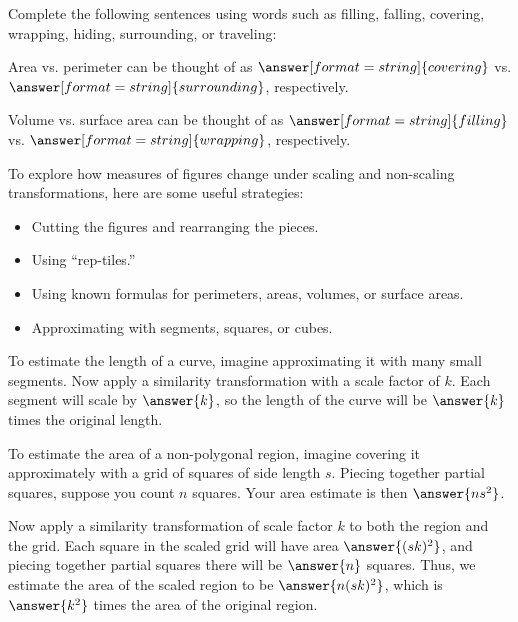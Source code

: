 \documentclass[nooutcomes]{ximera}
\begin{document}
\begin{question}
Complete the following sentences using words such as filling, falling, covering, wrapping, hiding, surrounding, or traveling:  

Area vs. perimeter can be thought of as $\answer[format=string]{covering}$ vs. $\answer[format=string]{surrounding}$, respectively. 

Volume vs. surface area can be thought of as $\answer[format=string]{filling}$ vs. $\answer[format=string]{wrapping}$, respectively. 
\end{question}


To explore how measures of figures change under scaling and non-scaling transformations, here are some useful strategies: 
\begin{itemize}
\item Cutting the figures and rearranging the pieces.  
\item Using ``rep-tiles.'' 
\item Using known formulas for perimeters, areas, volumes, or surface areas. 
\item Approximating with segments, squares, or cubes.  
\end{itemize}



\begin{question}
To estimate the length of a curve, imagine approximating it with many small segments.  Now apply a similarity transformation with a scale factor of $k$.  Each segment will scale by $\answer{k}$, so the length of the curve will be $\answer{k}$ times the original length.  
\end{question}

\begin{question}
To estimate the area of a non-polygonal region, imagine covering it approximately with a grid of squares of side length $s$.   Piecing together partial squares, suppose you count $n$ squares.  Your area estimate is then $\answer{ns^2}$.  

Now apply a similarity transformation of scale factor $k$ to both the region and the grid.  Each square in the scaled grid will have 
area $\answer{(sk)^2}$, and piecing together partial squares there will be $\answer{n}$ squares.  Thus, we estimate the area of the scaled region to be $\answer{n(sk)^2}$, which is $\answer{k^2}$ times the area of the original region.  
\end{question}
\end{document}
